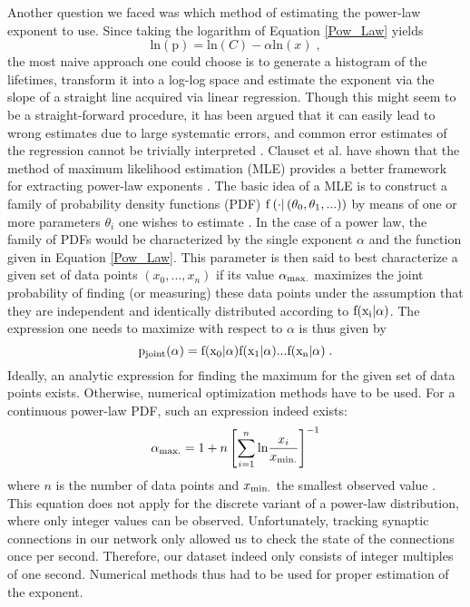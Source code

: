 \documentclass[10pt,a4paper]{article}
\begin{document}
Another question we faced was which method of estimating the power-law exponent to use. Since taking the logarithm of Equation \eqref{Pow_Law} yields
\begin{equation}
\mathrm{ln}(\mathrm{p}) = \mathrm{ln}(C) - \alpha \mathrm{ln}(x) \; ,
\label{Pow_Law_Log} 
\end{equation}
the most naive approach one could choose is to generate a histogram of the lifetimes, transform it into a log-log space and estimate the exponent via the slope of a straight line acquired via linear regression. Though this might seem to be a straight-forward procedure, it has been argued that it can easily lead to wrong estimates due to large systematic errors, and common error estimates of the regression cannot be trivially interpreted \cite{Bauke_2007,Clauset_2009}. Clauset et al. have shown that the method of maximum likelihood estimation (MLE) provides a better framework for extracting power-law exponents \cite{Clauset_2009}. The basic idea of a MLE is to construct a family of probability density functions (PDF) $\rm f \left( \cdot| \left( \theta_0,\theta_1,... \right) \right)$ by means of one or more parameters $\theta_i$ one wishes to estimate \cite{EncyMath_Max_Like}. In the case of a power law, the family of PDFs would be characterized by the single exponent $\alpha$ and the function given in Equation \eqref{Pow_Law}. This parameter is then said to best characterize a given set of data points $(x_0,...,x_n)$ if its value $\alpha_{\rm max.}$ maximizes the joint probability of finding (or measuring) these data points under the assumption that they are independent and identically distributed according to $\rm f(x_i|\alpha)$. The expression one needs to maximize with respect to $\alpha$ is thus given by
\begin{equation}
\rm p_{\rm joint}(\alpha) = f(x_0|\alpha)f(x_1|\alpha)...f(x_n|\alpha) \; .
\label{Joint_Prob_Pow_Law}
\end{equation}
Ideally, an analytic expression for finding the maximum for the given set of data points exists. Otherwise, numerical optimization methods have to be used. For a continuous power-law PDF, such an expression indeed exists:\begin{equation}
\alpha_{\rm max.} = 1 + n \left[ \sum_{i=1}^n \mathrm{ln}\frac{x_i}{x_{\rm min.}} \right]^{-1}
\end{equation}
where $n$ is the number of data points and $x_{\rm min.}$ the smallest observed value \cite{Clauset_2009}. This equation does not apply for the discrete variant of a power-law distribution, where only integer values can be observed. Unfortunately, tracking synaptic connections in our network only allowed us to check the state of the connections once per second. Therefore, our dataset indeed only consists of integer multiples of one second. Numerical methods thus had to be used for proper estimation of the exponent.
\end{document}
